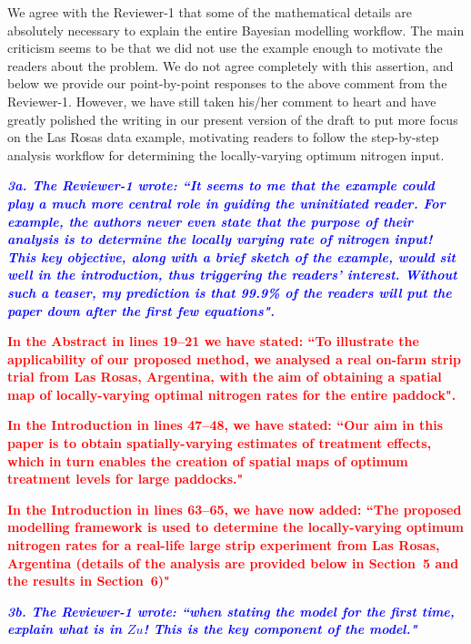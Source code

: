 \documentclass[a4paper]{article}   	%
\newcommand{\qtitle}[1]{\textit{\textbf{#1}}}
\begin{document}
\begin{enumerate}
    We agree with the Reviewer-1 that some of the mathematical details are absolutely necessary to explain the entire Bayesian modelling workflow. The main criticism seems to be that we did not use the example enough to motivate the readers about the problem. We do not agree completely with this assertion, and below we provide our point-by-point responses to the above comment from the Reviewer-1. However, we have still taken his/her comment to heart and have greatly polished the writing in our present version of the draft to put more focus on the Las Rosas data example, motivating readers to follow the step-by-step analysis workflow for determining the locally-varying optimum nitrogen input. 
    
    \qtitle{\textcolor{blue}{3a. The Reviewer-1 wrote: ``It seems to me that the example could play a much more central role in guiding the uninitiated reader. For example, the authors never even state that the purpose of their analysis is to determine the locally varying rate of nitrogen input! This key objective, along with a brief sketch of the example, would sit well in the introduction, thus triggering the readers' interest. Without such a teaser, my prediction is that 99.9\% of the readers will put the paper down after the first few equations".}}
    
    \textcolor{red}{\textbf{In the Abstract in lines 19--21 we have stated: ``To illustrate the applicability of our proposed method, we analysed a real on-farm strip trial from Las Rosas, Argentina, with the aim of obtaining a spatial map of locally-varying optimal nitrogen rates for the entire paddock".}}
    
    \textcolor{red}{\textbf{In the Introduction in lines 47--48, we have stated: ``Our aim in this paper is to obtain spatially-varying estimates of treatment effects, which in turn enables the creation of spatial maps of optimum treatment levels for large paddocks."}}
    
    \textcolor{red}{\textbf{In the Introduction in lines 63--65, we have now added: ``The proposed modelling framework is used to determine the locally-varying optimum nitrogen rates for a real-life large strip experiment from Las Rosas, Argentina (details of the analysis are provided below in Section~5 and the results in Section~6)"}}

     \qtitle{\textcolor{blue}{3b. The Reviewer-1 wrote: ``when stating the model for the first time, explain what is in $Zu$! This is the key component of the model."}}
     

\end{enumerate}
\end{document}

